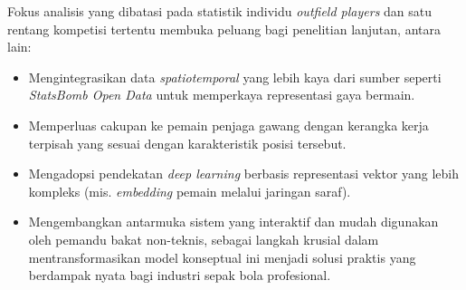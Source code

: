 Fokus analisis yang dibatasi pada statistik individu \emph{outfield players} dan satu rentang kompetisi tertentu membuka peluang bagi penelitian lanjutan, antara lain:

\begin{itemize}
  \item Mengintegrasikan data \emph{spatiotemporal} yang lebih kaya dari sumber seperti \emph{StatsBomb Open Data} untuk memperkaya representasi gaya bermain.
  \item Memperluas cakupan ke pemain penjaga gawang dengan kerangka kerja terpisah yang sesuai dengan karakteristik posisi tersebut.
  \item Mengadopsi pendekatan \emph{deep learning} berbasis representasi vektor yang lebih kompleks (mis. \emph{embedding} pemain melalui jaringan saraf).
  \item Mengembangkan antarmuka sistem yang interaktif dan mudah digunakan oleh pemandu bakat non-teknis, sebagai langkah krusial dalam mentransformasikan model konseptual ini menjadi solusi praktis yang berdampak nyata bagi industri sepak bola profesional.
\end{itemize}

